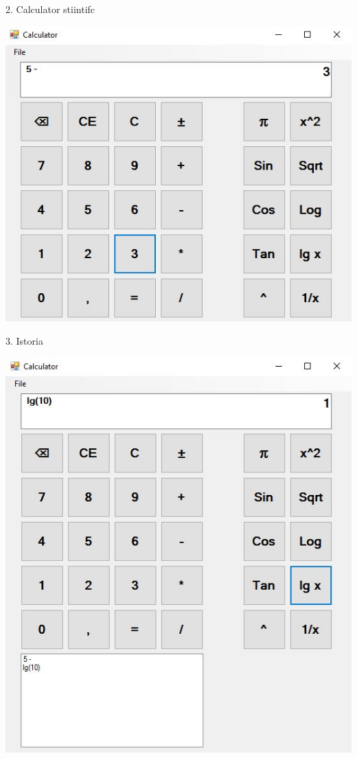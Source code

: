 \clearpage

2. Calculator stiintifc

\includegraphics{Cattura1.JPG}

\clearpage

3. Istoria

\includegraphics{Cattura2.JPG}




\clearpage
        
